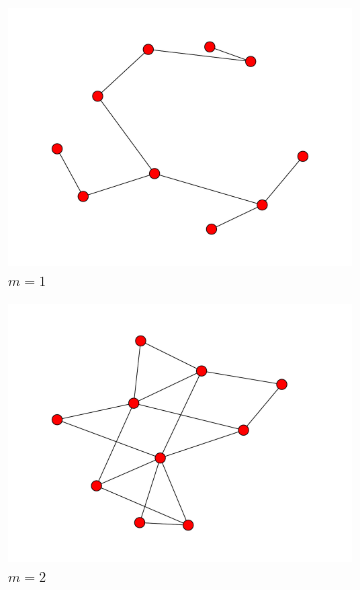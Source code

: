 \documentclass[10pt,a4paper]{scrartcl}
\begin{document}
\begin{figure}[h!]
\begin{center}
        \begin{subfigure}[b]{0.3\textwidth}
                \includegraphics[width=\textwidth]{figures/BA_graph_1.pdf}
                \caption{$m=1$}
        \end{subfigure}
	 \begin{subfigure}[b]{0.3\textwidth}
                \includegraphics[width=\textwidth]{figures/BA_graph_2.pdf}
                \caption{$m=2$}
        \end{subfigure}
	 \begin{subfigure}[b]{0.3\textwidth}

\end{subfigure}
\end{center}
\end{figure}
\end{document}
